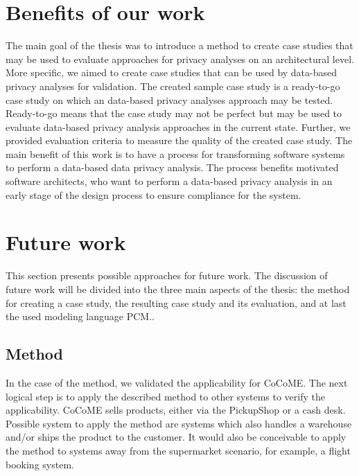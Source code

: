 \section{Benefits of our work}
The main goal of the thesis was to introduce a method to create case studies that may be used to evaluate approaches for privacy analyses on an architectural level. More specific, we aimed to create case studies that can be used by data-based privacy analyses for validation. The created sample case study is a ready-to-go case study on which an data-based privacy analyses approach may be tested. Ready-to-go means that the case study may not be perfect but may be used to evaluate data-based privacy analysis approaches in the current state.  Further, we provided evaluation criteria to measure the quality of the created case study. The main benefit of this work is to have a process for transforming software systems to perform a data-based data privacy analysis. The process benefits motivated software architects, who want to perform a data-based privacy analysis in an early stage of the design process to ensure compliance for the system.
\section{Future work} 
\label{FW}
This section presents possible approaches for future work. The discussion of future work will be divided into the three main aspects of the thesis: the method for creating a case study, the resulting case study and its evaluation, and at last the used modeling language PCM.. 
\subsection{Method}
In the case of the method, we validated the applicability for CoCoME. The next logical step is to apply the described method to other systems to verify the applicability. CoCoME  sells products, either via the PickupShop or a cash desk. Possible system to apply the method are systems which also handles a warehouse and/or ships the product to the customer. It would also be conceivable to apply the method to systems away from the supermarket scenario, for example, a flight booking system.
